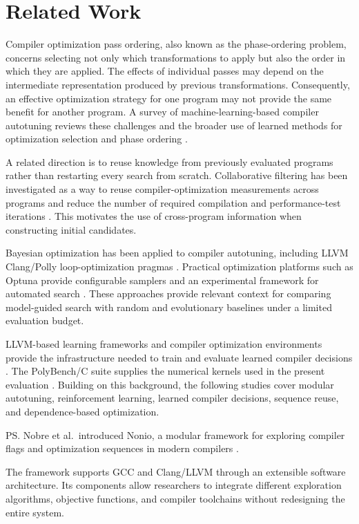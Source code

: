 \section{Related Work}
Compiler optimization pass ordering, also known as the phase-ordering problem, concerns selecting not only which transformations to apply but also the order in which they are applied. The effects of individual passes may depend on the intermediate representation produced by previous transformations. Consequently, an effective optimization strategy for one program may not provide the same benefit for another program. A survey of machine-learning-based compiler autotuning reviews these challenges and the broader use of learned methods for optimization selection and phase ordering \cite{ashouri2018survey}.

A related direction is to reuse knowledge from previously evaluated programs rather than restarting every search from scratch. Collaborative filtering has been investigated as a way to reuse compiler-optimization measurements across programs and reduce the number of required compilation and performance-test iterations \cite{cereda2020collab}. This motivates the use of cross-program information when constructing initial candidates.

Bayesian optimization has been applied to compiler autotuning, including LLVM Clang/Polly loop-optimization pragmas \cite{wu2022bayesian}. Practical optimization platforms such as Optuna provide configurable samplers and an experimental framework for automated search \cite{akiba2019optuna}. These approaches provide relevant context for comparing model-guided search with random and evolutionary baselines under a limited evaluation budget.

LLVM-based learning frameworks and compiler optimization environments provide the infrastructure needed to train and evaluate learned compiler decisions \cite{trofin2021mlgo,cummins2022compilergym}. The PolyBench/C suite supplies the numerical kernels used in the present evaluation \cite{pouchet2016polybench}. Building on this background, the following studies cover modular autotuning, reinforcement learning, learned compiler decisions, sequence reuse, and dependence-based optimization.

\ps{} Nobre et al.\ introduced Nonio, a modular framework for exploring compiler flags and optimization sequences in modern compilers \cite{nobre2019nonio}.

\me{} The framework supports GCC and Clang/LLVM through an extensible software architecture. Its components allow researchers to integrate different exploration algorithms, objective functions, and compiler toolchains without redesigning the entire system.

